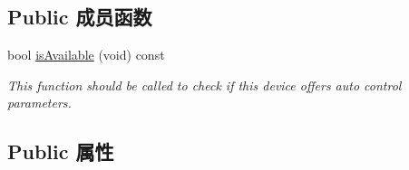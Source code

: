 \subsection*{Public 成员函数}
\begin{DoxyCompactItemize}
\item 
bool \hyperlink{classmv_i_m_p_a_c_t_1_1acquire_1_1_auto_control_parameters_ad08e53fcc7944fafd98e3e0bb2a38ac8}{is\+Available} (void) const 
\begin{DoxyCompactList}\small\item\em This function should be called to check if this device offers auto control parameters. \end{DoxyCompactList}\end{DoxyCompactItemize}
\subsection*{Public 属性}
